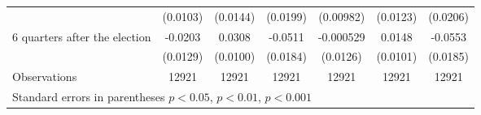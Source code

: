 \begin{table}[!ht]
\begin{tabular}{l*{6}{c}}
                    &    (0.0103)         &    (0.0144)         &    (0.0199)         &   (0.00982)         &    (0.0123)         &    (0.0206)         \\
[0,5em]
 6 quarters after the election&     -0.0203         &      0.0308\sym{**} &     -0.0511\sym{**} &   -0.000529         &      0.0148         &     -0.0553\sym{**} \\
                    &    (0.0129)         &    (0.0100)         &    (0.0184)         &    (0.0126)         &    (0.0101)         &    (0.0185)         \\
\hline
Observations        &       12921         &       12921         &       12921         &       12921         &       12921         &       12921         \\
\hline\hline
\multicolumn{7}{l}{\footnotesize Standard errors in parentheses \sym{*} \(p<0.05\), \sym{**} \(p<0.01\), \sym{***} \(p<0.001\)}\\
\end{tabular}
\end{table}
